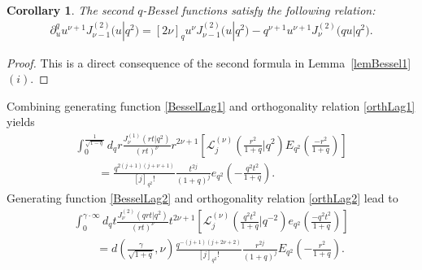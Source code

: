 \documentclass[11pt]{article}
\newtheorem{corollary}{Corollary}
\newcommand{\cL}{\mathcal{L}}
\numberwithin{equation}{section}
\begin{document}
\begin{corollary}
\label{lemBesselextra}
The second $q$-Bessel functions satisfy the following relation:
\begin{gather*}
\partial_u^q u^{\nu+1}J_{\nu-1}^{(2)}\big(u|q^2\big) = [2\nu]_qu^\nu J_{\nu-1}^{(2)}\big(u|q^2\big)-q^{\nu+1}u^{\nu+1}J_{\nu}^{(2)}\big(qu|q^2\big).
\end{gather*}
\end{corollary}
\begin{proof}
This is a direct consequence of the second formula in Lemma~\ref{lemBessel1}$(i)$.
\end{proof}




Combining generating function \eqref{BesselLag1} and orthogonality relation \eqref{orthLag1} yields
\begin{gather}
\int_0^{\frac{1}{\sqrt{1-q}}}d_qr \frac{J_\nu^{(1)}(rt|q^2)}{(rt)^{\nu}}r^{2\nu+1}\left[\cL_j^{(\nu)}\left(\frac{r^2}{1+q}|q^2\right)E_{q^2}\left(\frac{-r^2}{1+q}\right)\right]
\nonumber\\
\qquad {} =\frac{q^{2(j+1)(j+\nu+1)}}{[j]_{q^2}!}\frac{t^{2j}}{(1+q)^j}e_{q^2}\left(-\frac{q^2t^2}{1+q}\right).\label{preHank1}
\end{gather}
Generating function \eqref{BesselLag2} and orthogonality relation \eqref{orthLag2} lead to
\begin{gather} \int_0^{\gamma\cdot\infty}d_qt\frac{J_\nu^{(2)}(qrt|q^2)}{(rt)^{\nu}}t^{2\nu+1}\left[\cL_j^{(\nu)}
\left(\frac{q^2t^2}{1+q}|q^{-2}\right)e_{q^2}\left(\frac{-q^2t^2}{1+q}\right)\right]\nonumber\\
\qquad {}= d\left(\frac{\gamma}{\sqrt{1+q}},\nu\right)\frac{q^{-(j+1)(j+2\nu+2)}}{[j]_{q^2}!}\frac{r^{2j}}{(1+q)^j}E_{q^2}
\left(-\frac{r^2}{1+q}\right).\label{preHank2}
\end{gather}
\end{document}
